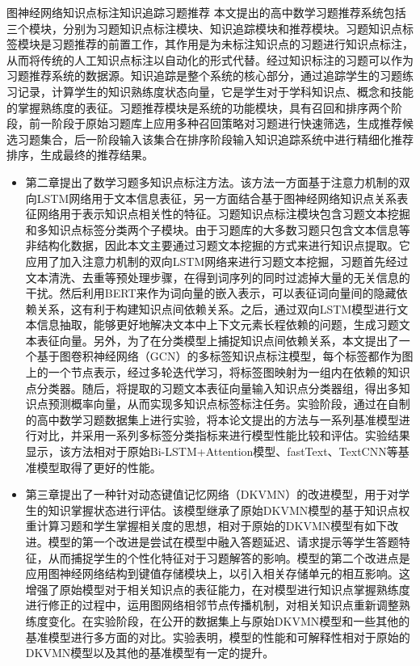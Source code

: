 \begin{abstractC}{图神经网络}{知识点标注}{知识追踪}{习题推荐}{}
    本文提出的高中数学习题推荐系统包括三个模块，分别为习题知识点标注模块、知识追踪模块和推荐模块。习题知识点标签模块是习题推荐的前置工作，其作用是为未标注知识点的习题进行知识点标注，从而将传统的人工知识点标注以自动化的形式代替。经过知识标注的习题可以作为习题推荐系统的数据源。知识追踪是整个系统的核心部分，通过追踪学生的习题练习记录，计算学生的知识熟练度状态向量，它是学生对于学科知识点、概念和技能的掌握熟练度的表征。习题推荐模块是系统的功能模块，具有召回和排序两个阶段，前一阶段于原始习题库上应用多种召回策略对习题进行快速筛选，生成推荐候选习题集合，后一阶段输入该集合在排序阶段输入知识追踪系统中进行精细化推荐排序，生成最终的推荐结果。
    \begin{itemize}
        \item 第二章提出了数学习题多知识点标注方法。该方法一方面基于注意力机制的双向LSTM网络用于文本信息表征，另一方面结合基于图神经网络知识点关系表征网络用于表示知识点相关性的特征。习题知识点标注模块包含习题文本挖掘和多知识点标签分类两个子模块。由于习题库的大多数习题只包含文本信息等非结构化数据，因此本文主要通过习题文本挖掘的方式来进行知识点提取。它应用了加入注意力机制的双向LSTM网络来进行习题文本挖掘，习题首先经过文本清洗、去重等预处理步骤，在得到词序列的同时过滤掉大量的无关信息的干扰。然后利用BERT来作为词向量的嵌入表示，可以表征词向量间的隐藏依赖关系，这有利于构建知识点间依赖关系。之后，通过双向LSTM模型进行文本信息抽取，能够更好地解决文本中上下文元素长程依赖的问题，生成习题文本表征向量。另外，为了在分类模型上捕捉知识点间依赖关系，本文提出了一个基于图卷积神经网络（GCN）的多标签知识点标注模型，每个标签都作为图上的一个节点表示，经过多轮迭代学习，将标签图映射为一组内在依赖的知识点分类器。随后，将提取的习题文本表征向量输入知识点分类器组，得出多知识点预测概率向量，从而实现多知识点标签标注任务。实验阶段，通过在自制的高中数学习题数据集上进行实验，将本论文提出的方法与一系列基准模型进行对比，并采用一系列多标签分类指标来进行模型性能比较和评估。实验结果显示，该方法相对于原始Bi-LSTM+Attention模型、fastText、TextCNN等基准模型取得了更好的性能。
        \item 第三章提出了一种针对动态键值记忆网络（DKVMN）的改进模型，用于对学生的知识掌握状态进行评估。该模型继承了原始DKVMN模型的基于知识点权重计算习题和学生掌握相关度的思想，相对于原始的DKVMN模型有如下改进。模型的第一个改进是尝试在模型中融入答题延迟、请求提示等学生答题特征，从而捕捉学生的个性化特征对于习题解答的影响。模型的第二个改进点是应用图神经网络结构到键值存储模块上，以引入相关存储单元的相互影响。这增强了原始模型对于相关知识点的表征能力，在对模型进行知识点掌握熟练度进行修正的过程中，运用图网络相邻节点传播机制，对相关知识点重新调整熟练度变化。在实验阶段，在公开的数据集上与原始DKVMN模型和一些其他的基准模型进行多方面的对比。实验表明，模型的性能和可解释性相对于原始的DKVMN模型以及其他的基准模型有一定的提升。

\end{itemize}
\end{abstractC}
